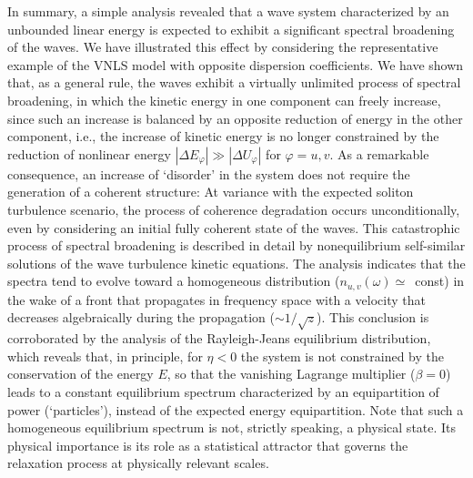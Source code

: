 \documentclass[pra,twocolumn,showpacs,preprintnumbers,amsmath,amssymb]{revtex4}
\def\vfi{\varphi}
\begin{document}
In summary, a simple analysis revealed that a wave system characterized by an unbounded linear energy is expected to exhibit a significant spectral broadening of the waves.
We have illustrated this effect by considering the representative  example of the VNLS model with opposite dispersion coefficients.
We have shown that, as a general rule, the waves exhibit a virtually unlimited process of spectral broadening, in which the kinetic energy in one component can freely increase, since such an increase is balanced by an opposite reduction of energy in the other component, i.e., the increase of kinetic energy is no longer constrained by the reduction of nonlinear energy $|\Delta E_\vfi| \gg |\Delta U_\vfi|$ for $\vfi=u,v$.
As a remarkable consequence, an increase of `disorder' in the system does not require the generation of a coherent structure: 
At variance with the expected soliton turbulence scenario, the  process of coherence degradation occurs unconditionally, even  by considering an initial fully coherent state of the waves.
This catastrophic process of spectral broadening is described in detail by nonequilibrium self-similar solutions of the wave turbulence kinetic equations. 
The analysis indicates that the spectra tend to evolve toward a homogeneous distribution ($n_{u,v}(\omega) \simeq$~const) in the wake of a front that propagates in frequency space with a velocity that decreases algebraically during the propagation ($\sim 1/\sqrt{z}$).
This conclusion is corroborated by the analysis of the Rayleigh-Jeans equilibrium distribution, which reveals that, in principle,  for $\eta < 0$ the system is not constrained by the conservation of the energy $E$, so that the vanishing Lagrange multiplier ($\beta=0$) leads to a constant equilibrium spectrum characterized by an equipartition of power (`particles'), instead of the expected energy equipartition. 
Note that such a homogeneous equilibrium spectrum is not, strictly speaking, a physical state. Its physical importance is its role as a statistical attractor that governs the relaxation process at physically relevant scales.
\end{document}
